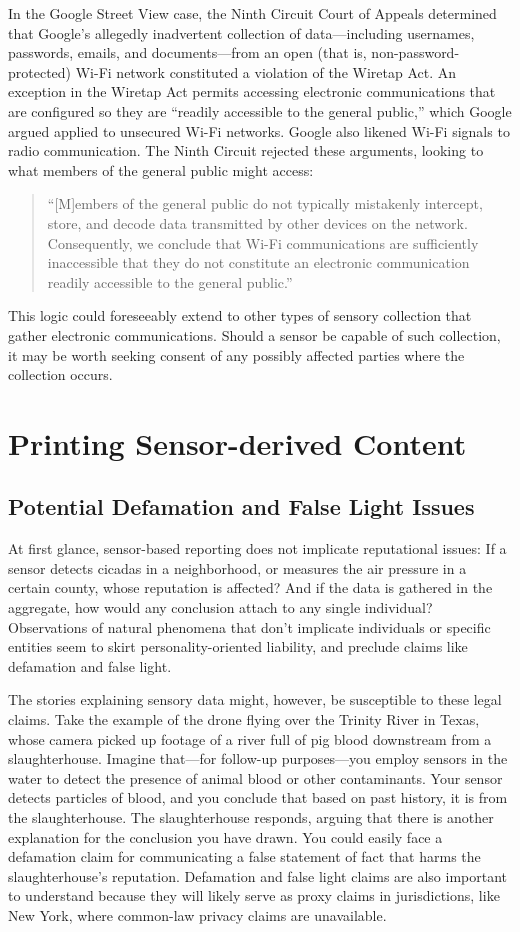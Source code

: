 In the Google Street View case, the Ninth Circuit Court of Appeals determined
that Google's allegedly inadvertent collection of data—including
usernames, passwords, emails, and documents—from an open (that is,
non-password-protected) Wi-Fi network constituted a violation of the
Wiretap Act. An exception in the Wiretap Act permits accessing electronic
communications that are configured so they are ``readily accessible to the
general public,'' which Google argued applied to unsecured Wi-Fi networks.
Google also likened Wi-Fi signals to radio communication. The Ninth Circuit
rejected these arguments, looking to what members of the general public
might access:
\begin{quote}
``[M]embers of the general public do not typically mistakenly intercept,
store, and decode data transmitted by other devices on the
network. Consequently, we conclude that Wi-Fi communications
are sufficiently inaccessible that they do not constitute an electronic
communication readily accessible to the general public.''
\end{quote}
This logic could foreseeably extend to other types of sensory collection that
gather electronic communications. Should a sensor be capable of such collection,
it may be worth seeking consent of any possibly affected parties
where the collection occurs.

\section{Printing Sensor-derived Content}
\subsection{Potential Defamation and False Light Issues}

At first glance, sensor-based reporting does not implicate reputational
issues: If a sensor detects cicadas in a neighborhood, or measures the air
pressure in a certain county, whose reputation is affected? And if the data
is gathered in the aggregate, how would any conclusion attach to any single
individual? Observations of natural phenomena that don't implicate individuals
or specific entities seem to skirt personality-oriented liability, and
preclude claims like defamation and false light.

The stories explaining sensory data might, however, be susceptible to these
legal claims. Take the example of the drone flying over the Trinity River in
Texas, whose camera picked up footage of a river full of pig blood downstream
from a slaughterhouse. Imagine that—for follow-up purposes—you
employ sensors in the water to detect the presence of animal blood or other
contaminants. Your sensor detects particles of blood, and you conclude that
based on past history, it is from the slaughterhouse. The slaughterhouse
responds, arguing that there is another explanation for the conclusion you
have drawn. You could easily face a defamation claim for communicating a
false statement of fact that harms the slaughterhouse's reputation.
Defamation and false light claims are also important to understand because
they will likely serve as proxy claims in jurisdictions, like New York, where
common-law privacy claims are unavailable.

